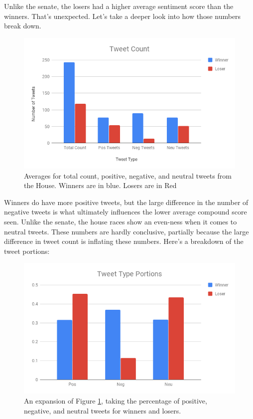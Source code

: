 \documentclass[11pt, twoside, reqno]{book}
\begin{document}
Unlike the senate, the losers had a higher average sentiment score than the winners. That's unexpected. Let's take a deeper look into how those numbers break down. 

\begin{figure}[H]
\centering
	\includegraphics[scale=0.5]{house_tweet_type}
	\caption{Averages for total count, positive, negative, and neutral tweets from the House. Winners are in blue. Losers are in Red}\label{fig:house_tweet_type}

\end{figure}

Winners do have more positive tweets, but the large difference in the number of negative tweets is what ultimately influences the lower average compound score seen. Unlike the senate, the house races show an even-ness when it comes to neutral tweets. These numbers are hardly conclusive, partially because the large difference in tweet count is inflating these numbers. Here's a breakdown of the tweet portions:

\begin{figure}[H]
\centering
	\includegraphics[scale=0.5]{house_tweet_breakdown}
	\caption{An expansion of Figure \ref{fig:house_tweet_type}, taking the percentage of positive, negative, and neutral tweets for winners and losers.}\label{fig:house_tweet_breakdown}	
\end{figure}
\end{document}
